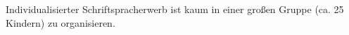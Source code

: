 Individualisierter Schriftspracherwerb ist kaum in einer großen Gruppe (ca. 25 Kindern) zu organisieren.